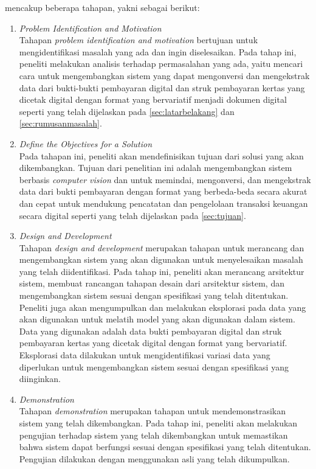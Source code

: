\dsrm{} mencakup beberapa tahapan, yakni sebagai berikut:
\begin{enumerate}
	\item \emph{Problem Identification and Motivation}~\\
	      Tahapan \emph{problem identification and motivation} bertujuan untuk mengidentifikasi masalah yang ada dan ingin diselesaikan. Pada tahap ini, peneliti melakukan analisis terhadap permasalahan yang ada, yaitu mencari cara untuk mengembangkan sistem yang dapat mengonversi dan mengekstrak data dari bukti-bukti pembayaran digital dan struk pembayaran kertas yang dicetak digital dengan format yang bervariatif menjadi dokumen digital seperti yang telah dijelaskan pada \autoref{sec:latarbelakang} dan \autoref{sec:rumusanmasalah}.
	\item \emph{Define the Objectives for a Solution}~\\
	      Pada tahapan ini, peneliti akan mendefinisikan tujuan dari solusi yang akan dikembangkan. Tujuan dari penelitian ini adalah mengembangkan sistem berbasis \emph{computer vision} dan \dl{} untuk memindai, mengonversi, dan mengekstrak data dari bukti pembayaran dengan format yang berbeda-beda secara akurat dan cepat untuk mendukung pencatatan dan pengelolaan transaksi keuangan secara digital seperti yang telah dijelaskan pada \autoref{sec:tujuan}.
	\item \emph{Design and Development}~\\
	      Tahapan \emph{design and development} merupakan tahapan untuk merancang dan mengembangkan sistem yang akan digunakan untuk menyelesaikan masalah yang telah diidentifikasi. Pada tahap ini, peneliti akan merancang arsitektur sistem, membuat rancangan tahapan desain dari arsitektur sistem, dan mengembangkan sistem sesuai dengan spesifikasi yang telah ditentukan.	Peneliti juga akan mengumpulkan dan melakukan eksplorasi pada data yang akan digunakan untuk melatih model \dl{} yang akan digunakan dalam sistem. Data yang digunakan adalah data bukti pembayaran digital dan struk pembayaran kertas yang dicetak digital dengan format yang bervariatif. Eksplorasi data dilakukan untuk mengidentifikasi variasi data yang diperlukan untuk mengembangkan sistem sesuai dengan spesifikasi yang diinginkan.
	\item \emph{Demonstration}~\\
	      Tahapan \emph{demonstration} merupakan tahapan untuk mendemonstrasikan sistem yang telah dikembangkan. Pada tahap ini, peneliti akan melakukan pengujian terhadap sistem yang telah dikembangkan untuk memastikan bahwa sistem dapat berfungsi sesuai dengan spesifikasi yang telah ditentukan. Pengujian dilakukan dengan menggunakan \dataset{} asli yang telah dikumpulkan.

\end{enumerate}

